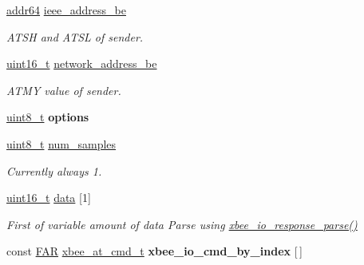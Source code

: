 \begin{DoxyCompactItemize}
\mbox{\label{group__xbee__io_ga231e348f98931de7fde1d09f64264afc}} 
\hyperlink{unionaddr64}{addr64} \hyperlink{group__xbee__io_ga231e348f98931de7fde1d09f64264afc}{ieee\+\_\+address\+\_\+be}
\begin{DoxyCompactList}\small\item\em A\+T\+SH and A\+T\+SL of sender. \end{DoxyCompactList}\item 
\mbox{\label{group__xbee__io_ga73d48563eb05cd5fcc4add79d226a3b8}} 
\hyperlink{group__hal__dos_ga5a8b2dc9e45a9ee81a94ef304fb62505}{uint16\+\_\+t} \hyperlink{group__xbee__io_ga73d48563eb05cd5fcc4add79d226a3b8}{network\+\_\+address\+\_\+be}
\begin{DoxyCompactList}\small\item\em A\+T\+MY value of sender. \end{DoxyCompactList}\item 
\mbox{\label{group__xbee__io_gaace3d640c8d449b8db1162993d259d3f}} 
\hyperlink{group__hal__dos_gae1affc9ca37cfb624959c866a73f83c2}{uint8\+\_\+t} {\bfseries options}
\item 
\mbox{\label{group__xbee__io_ga6bd874a22b34b2e3f911f90b07c4e6b4}} 
\hyperlink{group__hal__dos_gae1affc9ca37cfb624959c866a73f83c2}{uint8\+\_\+t} \hyperlink{group__xbee__io_ga6bd874a22b34b2e3f911f90b07c4e6b4}{num\+\_\+samples}
\begin{DoxyCompactList}\small\item\em Currently always 1. \end{DoxyCompactList}\item 
\mbox{\label{group__xbee__io_gac5955aa1e44ff234e6d78a19cf68f25c}} 
\hyperlink{group__hal__dos_ga5a8b2dc9e45a9ee81a94ef304fb62505}{uint16\+\_\+t} \hyperlink{group__xbee__io_gac5955aa1e44ff234e6d78a19cf68f25c}{data} \mbox{[}1\mbox{]}
\begin{DoxyCompactList}\small\item\em First of variable amount of data Parse using \hyperlink{group__xbee__io_ga49aae35ec2a46306bf2ad593cecbcf26}{xbee\+\_\+io\+\_\+response\+\_\+parse()} \end{DoxyCompactList}\item 
\mbox{\label{group__xbee__io_ga57790808110ca09ef2d7ec4a5573d4d2}} 
const \hyperlink{group__hal_gaef060b3456fdcc093a7210a762d5f2ed}{F\+AR} \hyperlink{unionxbee__at__cmd__t}{xbee\+\_\+at\+\_\+cmd\+\_\+t} {\bfseries xbee\+\_\+io\+\_\+cmd\+\_\+by\+\_\+index} \mbox{[}$\,$\mbox{]}
\end{DoxyCompactItemize}
